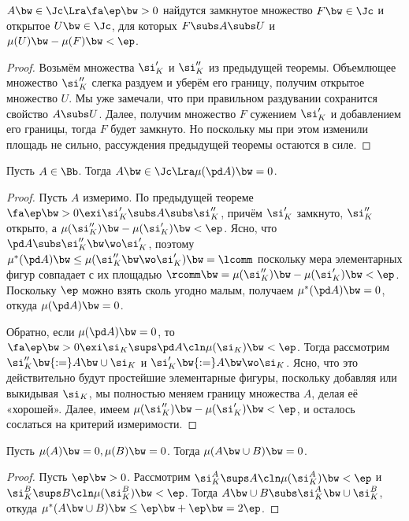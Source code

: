 \documentclass[a4paper]{article}
\begin{document}
\begin{imp}
$A\bw\in\Jc \Lra \fa \ep \bw> 0$ найдутся замкнутое множество $F \bw\in \Jc$ и открытое $U \bw\in \Jc$,
для которых $F \subs A \subs U$ и $\mu(U) \bw- \mu(F) \bw< \ep$.
\end{imp}
\begin{proof}
Возьмём множества $\si_K'$ и $\si_K''$ из предыдущей теоремы. Объемлющее множество $\si_K''$ слегка
раздуем и уберём его границу, получим открытое множество $U$. Мы уже замечали, что при правильном
раздувании сохранится свойство $A \subs U$. Далее, получим множество $F$ сужением $\si_K'$ и
добавлением его границы, тогда $F$ будет замкнуто. Но поскольку мы при этом изменили площадь не
сильно, рассуждения предыдущей теоремы остаются в силе.
\end{proof}

\begin{theorem}
Пусть $A\in\Bb$. Тогда $A \bw\in \Jc \Lra \mu(\pd A) \bw=0$.
\end{theorem}
\begin{proof}
Пусть $A$ измеримо. По предыдущей теореме $\fa \ep \bw> 0 \exi \si_K' \subs A \subs \si_K''$, причём
$\si_K'$ замкнуто, $\si_K''$ открыто, а $\mu(\si_K'') \bw- \mu(\si_K') \bw< \ep$. Ясно, что $\pd A \subs
\si_K'' \bw\wo \si_K'$, поэтому $\mu^*(\pd A) \bw\le \mu(\si_K'' \bw\wo \si_K') \bw= \lcomm$ поскольку мера
элементарных фигур совпадает с их площадью $\rcomm \bw= \mu(\si_K'') \bw- \mu(\si_K') \bw< \ep$. Поскольку
$\ep$ можно взять сколь угодно малым, получаем $\mu^*(\pd A) \bw= 0$, откуда $\mu(\pd A) \bw= 0$.

Обратно, если $\mu(\pd A) \bw= 0$, то $\fa \ep \bw> 0 \exi \si_K \sups \pd A\cln \mu(\si_K) \bw< \ep$. Тогда
рассмотрим $\si_K'' \bw{:=}A \bw\cup \si_K$ и $\si_K' \bw{:=}A \bw\wo \si_K$. Ясно, что это действительно
будут простейшие элементарные фигуры, поскольку добавляя или выкидывая $\si_K$, мы полностью меняем
границу множества $A$, делая её «хорошей». Далее, имеем $\mu(\si_K'') \bw- \mu(\si_K') \bw< \ep$, и
осталось сослаться на критерий измеримости.
\end{proof}

\begin{lemma}
Пусть $\mu(A) \bw= 0, \mu(B) \bw= 0$. Тогда $\mu(A \bw\cup B) \bw= 0$.
\end{lemma}
\begin{proof}
Пусть $\ep \bw> 0$. Рассмотрим $\si_K^A \sups A\cln \mu(\si_K^A) \bw< \ep$ и $\si_K^B \sups B\cln
\mu(\si_K^B) \bw< \ep$. Тогда $A \bw\cup B \subs \si_K^A \bw\cup \si_K^B$, откуда $\mu^*(A \bw\cup B) \bw\le \ep \bw+
\ep \bw= 2\ep$.
\end{proof}
\end{document}
